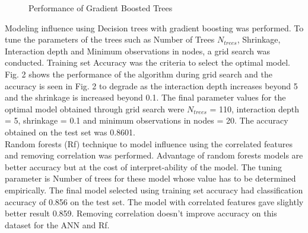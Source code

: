 \begin{figure}[!h]
\centering
{}
\caption{Performance of Gradient Boosted Trees}
\label{fig 1}
\end{figure}

Modeling influence using Decision trees with gradient boosting was performed. To tune the parameters of the trees such as Number of Trees $N_{trees}$, Shrinkage, Interaction depth and Minimum observations in nodes, a grid search was conducted. Training set Accuracy was the criteria to select the optimal model. Fig. 2 shows the performance of the algorithm during grid search and the accuracy is seen in Fig. 2 to degrade as the interaction depth increases beyond 5 and the shrinkage is increased beyond 0.1.  The final parameter values for the optimal model obtained through grid search were $N_{trees}$ = 110, interaction depth = 5, shrinkage = 0.1 and minimum observations in nodes = 20. The accuracy obtained on the test set was 0.8601.\\

Random forests (Rf) technique to model influence using the correlated features and removing correlation was performed. Advantage of random forests models are better accuracy but at the cost of interpret-ability of the model. The tuning parameter is Number of trees for these model whose value has to be determined empirically. The final model selected using training set accuracy had classification accuracy of 0.856 on the test set. The model with correlated features gave slightly better result 0.859. Removing correlation doesn’t improve accuracy on this dataset for the ANN and Rf.\\

